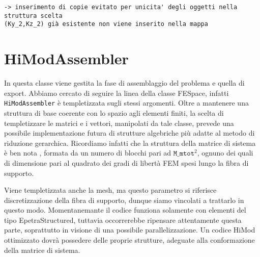 \begin{lstlisting}[style = general,frame=top]
-> inserimento di copie evitato per unicita' degli oggetti nella struttura scelta
(Ky_2,Kz_2) già esistente non viene inserito nella mappa
\end{lstlisting}




\section{HiModAssembler}
 
 In questa classe viene gestita la fase di assemblaggio del problema e quella di export. Abbiamo cercato di seguire la linea della classe 
FESpace, infatti \texttt{HiModAssembler} \`e templetizzata sugli stessi argomenti. Oltre a mantenere una struttura di base coerente con lo 
spazio agli elementi finiti, la scelta di templetizzare le matrici e i vettori, manipolati da tale classe, prevede una possibile implementazione 
futura di strutture algebriche pi\`u adatte al metodo di riduzione gerarchica. Ricordiamo infatti che la struttura della matrice di sistema \`e 
ben nota  , formata da un numero di blocchi pari ad $\texttt{M\_mtot}^2$, ognuno dei quali di dimensione pari al quadrato 
dei gradi di libert\`a FEM spesi lungo la fibra di supporto.
 

 
 Viene templetizzata anche la mesh, ma questo parametro si riferisce discretizzazione della fibra di supporto, dunque siamo vincolati a 
trattarlo in questo modo.
 Momentanemante il codice funziona solamente con elementi del tipo EpetraStructured, tuttavia occorrerebbe ripensare attentamente questa parte, 
soprattutto in visione di una possibile parallelizzazione.
Un codice HiMod ottimizzato dovr\`a possedere delle proprie strutture, adeguate alla conformazione della matrice di sistema.

